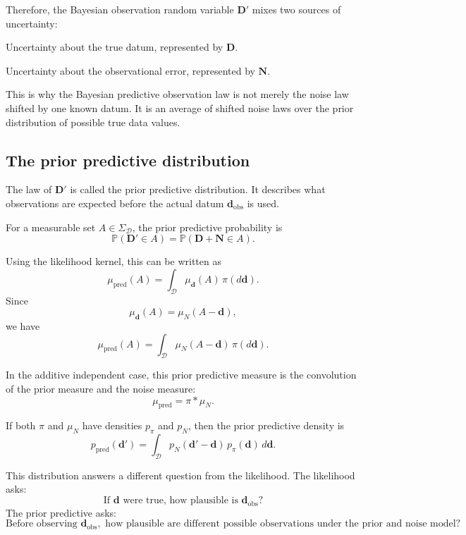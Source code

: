 \documentclass[11pt]{article}
\newcommand{\Dspace}{\mathcal D}
\newcommand{\SigmaD}{\Sigma_{\mathcal D}}
\newcommand{\muN}{\mu_N}
\newcommand{\prior}{\pi}
\newcommand{\Drand}{\mathbf D}
\newcommand{\Dobsrand}{\mathbf D'}
\newcommand{\Nrand}{\mathbf N}
\newcommand{\dobs}{\mathbf d_{\mathrm{obs}}}
\newcommand{\Prob}{\mathbb P}
\begin{document}
Therefore, the Bayesian observation random variable \(\Dobsrand\) mixes two sources of uncertainty:
\begin{description}[leftmargin=2.8cm,style=nextline]
    \item[Prior uncertainty.]
    Uncertainty about the true datum, represented by \(\Drand\).

    \item[Noise uncertainty.]
    Uncertainty about the observational error, represented by \(\Nrand\).
\end{description}

This is why the Bayesian predictive observation law is not merely the noise law shifted by one known datum. It is an average of shifted noise laws over the prior distribution of possible true data values.

\subsection{The prior predictive distribution}

The law of \(\Dobsrand\) is called the prior predictive distribution. It describes what observations are expected before the actual datum \(\dobs\) is used.

For a measurable set \(A\in\SigmaD\), the prior predictive probability is
\[
    \Prob(\Dobsrand\in A)
    =
    \Prob(\Drand+\Nrand\in A).
\]

Using the likelihood kernel, this can be written as
\[
    \mu_{\mathrm{pred}}(A)
    =
    \int_{\Dspace}
        \mu_{\mathbf d}(A)
    \,\prior(d\mathbf d).
\]
Since
\[
    \mu_{\mathbf d}(A)
    =
    \muN(A-\mathbf d),
\]
we have
\[
    \mu_{\mathrm{pred}}(A)
    =
    \int_{\Dspace}
        \muN(A-\mathbf d)
    \,\prior(d\mathbf d).
\]

In the additive independent case, this prior predictive measure is the convolution of the prior measure and the noise measure:
\[
    \mu_{\mathrm{pred}}
    =
    \prior * \muN.
\]

If both \(\prior\) and \(\muN\) have densities \(p_{\prior}\) and \(p_N\), then the prior predictive density is
\[
    p_{\mathrm{pred}}(\mathbf d')
    =
    \int_{\Dspace}
        p_N(\mathbf d'-\mathbf d)\,
        p_{\prior}(\mathbf d)
    \,d\mathbf d.
\]

This distribution answers a different question from the likelihood. The likelihood asks:
\[
    \text{If } \mathbf d \text{ were true, how plausible is } \dobs?
\]
The prior predictive asks:
\[
    \text{Before observing } \dobs,
    \text{ how plausible are different possible observations under the prior and noise model?}
\]
\end{document}
